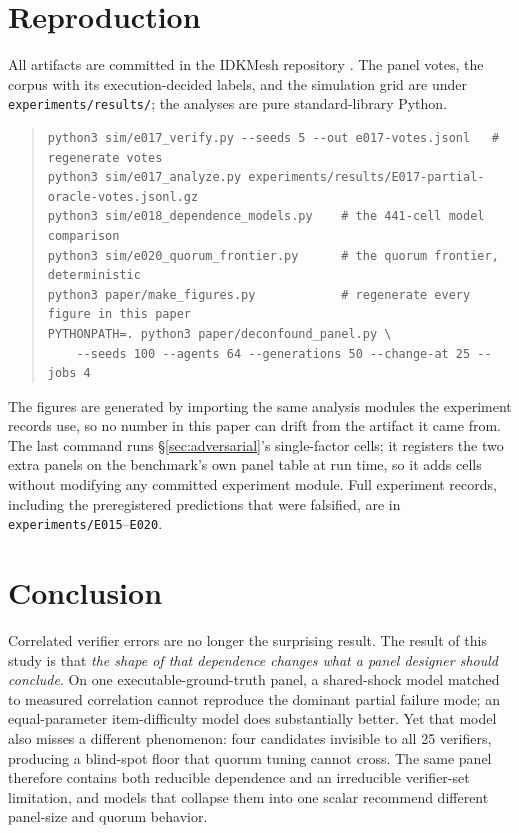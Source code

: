 \documentclass[11pt,a4paper]{article}
\newcommand{\code}[1]{\texttt{#1}}
\begin{document}
\section{Reproduction}
\label{sec:repro}

All artifacts are committed in the IDKMesh repository \citep{idkmesh}. The panel
votes, the corpus with its execution-decided labels, and the simulation grid are
under \code{experiments/results/}; the analyses are pure standard-library Python.

\begin{quote}\small
\begin{verbatim}
python3 sim/e017_verify.py --seeds 5 --out e017-votes.jsonl   # regenerate votes
python3 sim/e017_analyze.py experiments/results/E017-partial-oracle-votes.jsonl.gz
python3 sim/e018_dependence_models.py    # the 441-cell model comparison
python3 sim/e020_quorum_frontier.py      # the quorum frontier, deterministic
python3 paper/make_figures.py            # regenerate every figure in this paper
PYTHONPATH=. python3 paper/deconfound_panel.py \
    --seeds 100 --agents 64 --generations 50 --change-at 25 --jobs 4
\end{verbatim}
\end{quote}

The figures are generated by importing the same analysis modules the experiment
records use, so no number in this paper can drift from the artifact it came from.
The last command runs \S\ref{sec:adversarial}'s single-factor cells; it registers
the two extra panels on the benchmark's own panel table at run time, so it adds
cells without modifying any committed experiment module.
Full experiment records, including the preregistered predictions that were
falsified, are in \code{experiments/E015}--\code{E020}.

\section{Conclusion}

Correlated verifier errors are no longer the surprising result. The result of
this study is that \emph{the shape of that dependence changes what a panel
designer should conclude}. On one executable-ground-truth panel, a shared-shock
model matched to measured correlation cannot reproduce the dominant partial
failure mode; an equal-parameter item-difficulty model does substantially better.
Yet that model also misses a different phenomenon: four candidates invisible to
all 25 verifiers, producing a blind-spot floor that quorum tuning cannot cross.
The same panel therefore contains both reducible dependence and an irreducible
verifier-set limitation, and models that collapse them into one scalar recommend
different panel-size and quorum behavior.
\end{document}
